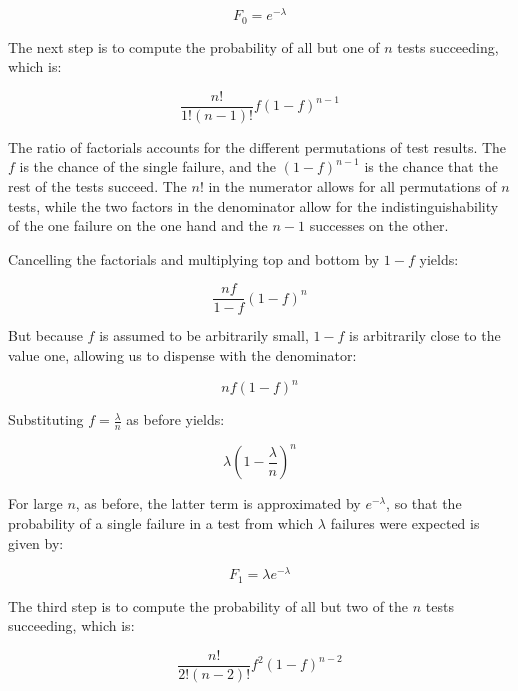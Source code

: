 \begin{equation}
	F_0 = e^{-\lambda}
\end{equation}

The next step is to compute the probability of all but one of $n$ tests
succeeding, which is:

\begin{equation}
	\frac{n!}{1!(n-1)!}f(1 - f)^{n-1}
\end{equation}

The ratio of factorials accounts for the different permutations of test
results.
The $f$ is the chance of the single failure, and the
$(1 - f)^{n-1}$ is the chance that the rest of the tests succeed.
The $n!$ in the numerator allows for all permutations of $n$ tests,
while the two factors in the denominator allow for the indistinguishability
of the one failure on the one hand and the $n-1$ successes on the other.

Cancelling the factorials and multiplying top and bottom by $1-f$ yields:

\begin{equation}
	\frac{nf}{1 - f} (1 - f)^n
\end{equation}

But because $f$ is assumed to be arbitrarily small, $1-f$ is arbitrarily
close to the value one, allowing us to dispense with the denominator:

\begin{equation}
	n f (1 - f)^n
\end{equation}

Substituting $f=\frac{\lambda}{n}$ as before yields:

\begin{equation}
	\lambda (1 - \frac{\lambda}{n})^n
\end{equation}

For large $n$, as before, the latter term is approximated by $e^{-\lambda}$,
so that the probability of a single failure in a test from which
$\lambda$ failures were expected is given by:

\begin{equation}
	F_1 = \lambda e^{-\lambda}
\end{equation}

The third step is to compute the probability of all but two of the $n$
tests succeeding, which is:

\begin{equation}
	\frac{n!}{2!(n-2)!}f^2(1 - f)^{n-2}
\end{equation}

